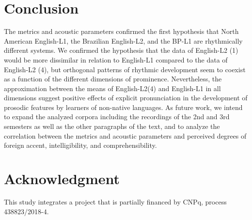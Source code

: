 \section{Conclusion}
The metrics and acoustic parameters confirmed the first hypothesis that North
American English-L1, the Brazilian English-L2, and the BP-L1 are rhythmically
different systems. We confirmed the hypothesis that the data of English-L2 (1)
would be more dissimilar in relation to English-L1 compared to the data of
English-L2 (4), but orthogonal patterns of rhythmic development seem to coexist
as a function of the different dimensions of prominence. Nevertheless, the
approximation between the means of English-L2(4) and English-L1 in all
dimensions suggest positive effects of explicit pronunciation in the
development of prosodic features by learners of non-native languages.  As
future work, we intend to expand the analyzed corpora including the recordings
of the 2nd and 3rd semesters as well as the other paragraphs of the text, and
to analyze the correlation between the metrics and acoustic parameters and
perceived degrees of foreign accent, intelligibility, and comprehensibility.  



\section{Acknowledgment}

This study integrates a project that is partially financed by CNPq, process 438823/2018-4.





